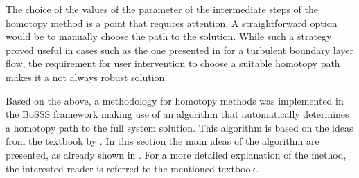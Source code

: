The choice of the values of the parameter of the intermediate steps of the homotopy method is a point that requires attention. A straightforward option would be to manually choose the path to the solution. While such a strategy proved useful in cases such as the one presented in \parencite{klingenbergdarioDevelopmentNovelReynoldsaveraged2022} for a turbulent boundary layer flow, the requirement for user intervention to choose a suitable homotopy path makes it a not always robust solution. 

Based on the above, a methodology for homotopy methods was implemented in the BoSSS framework making use of an algorithm that automatically determines a homotopy path to the full system solution. This algorithm is based on the ideas from the textbook by  \textcite{deuflhardNewtonMethodsNonlinear2011}. In this section the main ideas of the algorithm are presented, as already shown in \parencite{gutierrez-jorqueraFullyCoupledHighorder2022}. For a more detailed explanation of the method, the interested reader is referred to the mentioned textbook.


